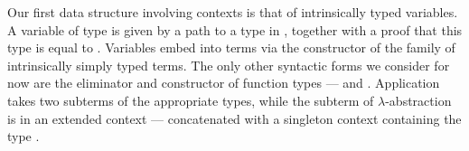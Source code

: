 \Ctx{}

Our first data structure involving contexts is that of intrinsically typed
variables.
A variable of type
\AgdaBound{$\Gamma$}\AgdaSpace{}\AgdaRecord{$\ni$}\AgdaSpace{}
is given by a path  to a type in \AgdaBound{$\Gamma$}, together
with a proof  that this type is equal to .
Variables embed into terms via the  constructor of
the family  of intrinsically simply typed terms.
The only other syntactic forms we consider for now are the eliminator and
constructor of function types  ---
 and .
Application  takes two subterms of the appropriate
types, while the subterm of $\lambda$-abstraction 
is in an extended context \GA{} --- \AgdaBound{$\Gamma$} concatenated with a
singleton context containing the type .

\Var{}
\Term{}

